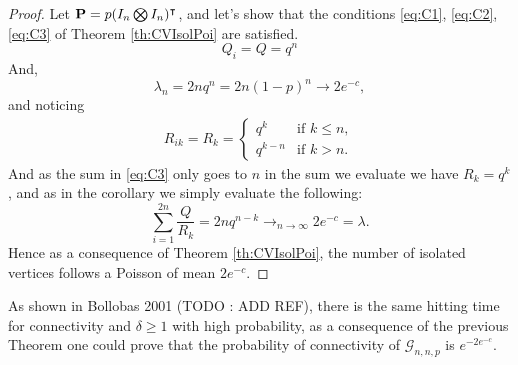 \begin{proof}
	Let $\bold{P} = p(I_n\bigotimes I_n)^\intercal$, and let's show that the conditions \eqref{eq:C1}, \eqref{eq:C2}, \eqref{eq:C3} of Theorem \ref{th:CVIsolPoi} are satisfied. 
	\begin{equation}
		Q_i = Q = q^{n}
	\end{equation}
	And,
	\begin{equation}
		\lambda_n = 2n q^{n}= 2n(1-p)^n \longrightarrow 2 e^{-c},
	\end{equation}
	and noticing 
	\begin{align}
		R_{ik} = R_k = \left\{	\begin{array}{rl}
						q^k & \text{if } k\leq n,\\
						q^{k-n} & \text{if } k > n.
					 \end{array}
				\right.
	\end{align}
	And as the sum in \eqref{eq:C3} only goes to $n$ in the sum we evaluate we have $R_k = q^k$, and as in the corollary we simply evaluate the following:
	\begin{equation}
		\sum_{i=1}^{2n} \frac{Q}{R_k} =2n q^{n-k} \longrightarrow_{n\to\infty} 2e^{-c} = \lambda.
	\end{equation}
	Hence as a consequence of Theorem \ref{th:CVIsolPoi}, the number of isolated vertices follows a Poisson of mean $2e^{-c}$.
\end{proof}
As shown in Bollobas 2001 (TODO : ADD REF), there is the same hitting time for connectivity and $\delta \geq 1$ with high probability, as a consequence of the previous Theorem one could prove that the probability of connectivity of $\mathcal{G}_{n,n, p}$ is $e^{-2e^{-c}}$. 
